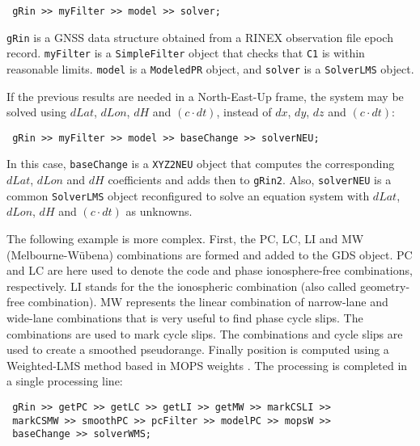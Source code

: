 \documentclass[letterpaper,ugly,10pt]{ion-gps}
\newcommand{\gpstkclass}[1]{\texttt{\mbox{#1}}}
\newcommand{\rinexobservable}[1]{\texttt{#1}}
\begin{document}
\begin{scriptsize}
\begin{lstlisting}
 gRin >> myFilter >> model >> solver;
\end{lstlisting}
\end{scriptsize}

\gpstkclass{gRin} is a GNSS data structure obtained from a RINEX observation file epoch record. \gpstkclass{myFilter} is a \gpstkclass{SimpleFilter} object that checks that \rinexobservable{C1} is within reasonable limits. \gpstkclass{model} is a \gpstkclass{ModeledPR} object, and 
\gpstkclass{solver} is a \gpstkclass{SolverLMS} object.

If the previous results are needed in a North-East-Up frame, the system may be solved using $dLat$, $dLon$, $dH$ and $(c \cdot dt)$, instead of $dx$, $dy$, $dz$ and $(c \cdot dt)$:

\begin{scriptsize}
\begin{lstlisting}
 gRin >> myFilter >> model >> baseChange >> solverNEU;
\end{lstlisting}
\end{scriptsize}

In this case, \gpstkclass{baseChange} is a \gpstkclass{XYZ2NEU} object that computes the corresponding $dLat$, $dLon$ and $dH$ coefficients and adds then to \gpstkclass{gRin2}. Also, \gpstkclass{solverNEU} is a common \gpstkclass{SolverLMS} object reconfigured to solve an equation system with $dLat$, $dLon$, $dH$ and $(c \cdot dt)$ as unknowns.

The following example is more complex. First, the PC, LC, LI and MW (Melbourne-W\"ubena) combinations are formed and added to the GDS object. PC and LC are here used to denote the code and phase ionosphere-free combinations, respectively. LI stands for the the ionospheric combination (also called geometry-free combination). MW represents the linear combination of narrow-lane and wide-lane combinations that is very useful to find phase cycle slips. The combinations are used to mark cycle slips. The combinations and cycle slips are used to create a smoothed pseudorange. Finally position is computed using a Weighted-LMS method based in MOPS weights \cite{mopsstandard}. The processing is completed in a single processing line:

\begin{scriptsize}
\begin{lstlisting}
 gRin >> getPC >> getLC >> getLI >> getMW >> markCSLI >>
 markCSMW >> smoothPC >> pcFilter >> modelPC >> mopsW >>
 baseChange >> solverWMS;
\end{lstlisting}
\end{scriptsize}
\end{document}
